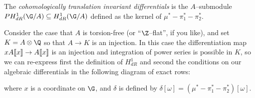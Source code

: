 \begin{definition}
The \textit{cohomologically translation invariant differentials} is the $A$--submodule $PH^1_{dR}(\G/A) \subseteq H^1_{dR}(\G/A)$ defined as the kernel of $\mu^* - \pi_1^* - \pi_2^*$.
\end{definition}

\begin{example}{\cite[Lemma 5.1.2]{Katz}}
Consider the case that $A$ is torsion-free (or ``$\Z$--flat'', if you like), and set $K = A \otimes \Q$ so that $A \to K$ is an injection.  In this case the differentiation map $x A\llbracket{x}\rrbracket \to A\llbracket{x}\rrbracket$ is an injection and integration of power series is possible in $K$, so we can re-express first the definition of $H^1_{dR}$ and second the conditions on our algebraic differentials in the following diagram of exact rows:
\begin{center}
\end{center}
where $x$ is a coordinate on $\G$, and $\delta$ is defined by $\delta [\omega] = (\mu^* - \pi_1^* - \pi_2^*)[\omega]$.
\end{example}


